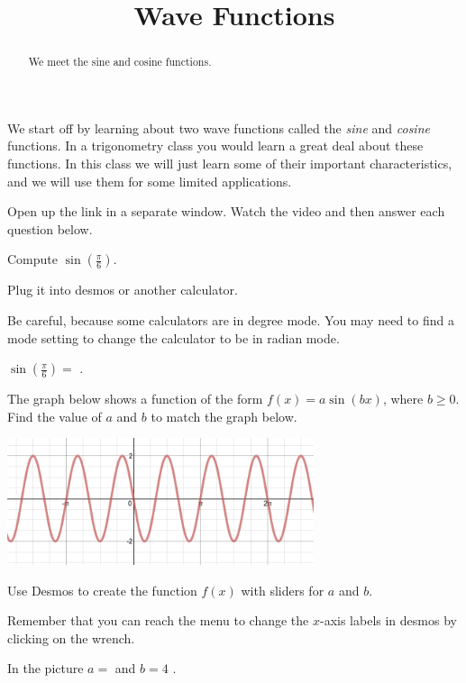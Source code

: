 \documentclass{ximera}
\title{Wave Functions}
\begin{document}
\begin{abstract}
We meet the sine and cosine functions.
\end{abstract}
\maketitle


We start off by learning about two wave functions called the \emph{sine} and \emph{cosine} functions. In a trigonometry class you would learn a great deal about these functions. In this class we will just learn some of their important characteristics, and we will use them for some limited applications.

Open up the link  in a separate window. Watch the video and then answer each question below. 

\begin{exercise}
Compute $\sin\left(\frac{\pi}{6}\right)$.
\begin{solution} 
\begin{hint}
Plug it into desmos or another calculator. 
\end{hint}
\begin{hint}
Be careful, because some calculators are in degree mode. You may need to find a mode setting to change the calculator to be in radian mode.
\end{hint}
$\sin\left(\frac{\pi}{6}\right)=$ .
\end{solution}
\end{exercise}

\begin{question}
The graph below shows a function of the form $f(x)=a\sin(bx)$, where $b\ge0$. Find the value of $a$ and $b$ to match the graph below.
\begin{image}
\includegraphics[width=9cm]{mysterysine.png}
\end{image}
\begin{solution}
\begin{hint}
Use Desmos to create the function $f(x)$ with sliders for $a$ and $b$. 
\end{hint}
\begin{hint}
Remember that you can reach the menu to change the $x$-axis labels in desmos by clicking on the wrench.
\end{hint}
In the picture $a=$  and $b=4$ .
\end{solution}
\end{question}
\end{document}

